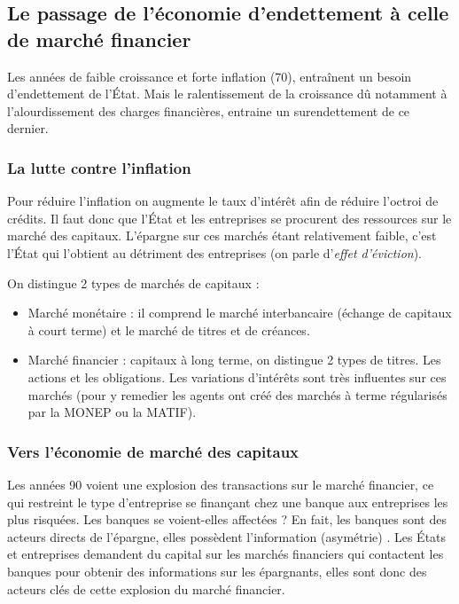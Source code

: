 \subsection{Le passage de l'économie d'endettement à celle de marché financier} %
\label{sec:le_passage_de_l_economie_d_endettement_a_celle_de_marche_financier}

Les années de faible croissance et forte inflation (70), entraînent un besoin d'endettement de l'État. Mais le ralentissement de la croissance dû notamment à 
l'alourdissement des charges financières, entraine un surendettement de ce dernier.

\subsubsection{La lutte contre l'inflation} %
\label{sub:la_lutte_contre_l_inflation}

Pour réduire l'inflation on augmente le taux d'intérêt afin de réduire l'octroi de crédits. Il faut donc que l'État et les entreprises se procurent des 
ressources sur le marché des capitaux. L'épargne sur ces marchés étant relativement faible, c'est l'État qui l'obtient au détriment des entreprises (on parle
d'\emph{effet d'éviction}).

On distingue 2 types de marchés de capitaux : 
\begin{itemize}[label=]
	\item Marché monétaire : il comprend le marché interbancaire (échange de capitaux à court terme) et le marché de titres et de créances.
	\item Marché financier : capitaux à long terme, on distingue 2 types de titres. Les actions et les obligations. Les variations d'intérêts sont très influentes sur ces marchés (pour y remedier les agents ont créé des marchés à terme régularisés par la MONEP ou la MATIF).
\end{itemize}


\subsubsection{Vers l'économie de marché des capitaux} %
\label{sub:vers_l_economie_de_marche_des_capitaux}

Les années 90 voient une explosion des transactions sur le marché financier, ce qui restreint le type d'entreprise se finançant chez une banque aux entreprises
les plus risquées. Les banques se voient-elles affectées ? En fait, les banques sont des acteurs directs de l'épargne, elles possèdent l'information (asymétrie)
. Les États et entreprises demandent du capital sur les marchés financiers qui contactent les banques pour obtenir des informations sur les épargnants, elles 
sont donc des acteurs clés de cette explosion du marché financier.

